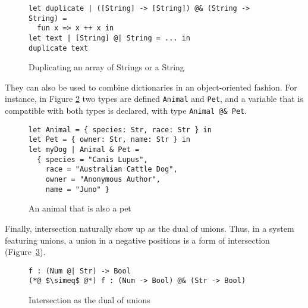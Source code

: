\documentclass[sigplan,10pt,review,anonymous]{acmart}
\newcommand{\nickel}[1]{\lstinline[language=nickel]{#1}}
\begin{document}
\begin{figure}[h]
\begin{lstlisting}[language=nickel]
let duplicate | ([String] -> [String]) @& (String -> String) =
  fun x => x ++ x in
let text | [String] @| String = ... in
duplicate text
\end{lstlisting}
\caption{Duplicating an array of Strings or a String}
\label{fig:intersection-overloading-ex}
\end{figure}



They can also be used to combine dictionaries in an object-oriented fashion. For instance, in Figure \ref{fig:intersection-record}
two types are defined \nickel{Animal} and \nickel{Pet}, and
a variable that is compatible with both types is declared, with
type \nickel{Animal @& Pet}.

\begin{figure}[h]
\begin{lstlisting}[language=nickel]
let Animal = { species: Str, race: Str } in
let Pet = { owner: Str, name: Str } in
let myDog | Animal & Pet =
  { species = "Canis Lupus",
    race = "Australian Cattle Dog",
    owner = "Anonymous Author",
    name = "Juno" }
\end{lstlisting}
\caption{An animal that is also a pet}
\label{fig:intersection-record}
\end{figure}




Finally, intersection naturally show up as the dual of unions.
Thus, in a system
featuring unions, a union in a negative positions is a form of intersection
(Figure~\ref{fig:intersection-dual}).

\begin{figure}[h]
\begin{lstlisting}[language = nickel]
f : (Num @| Str) -> Bool
(*@ $\simeq$ @*) f : (Num -> Bool) @& (Str -> Bool)
\end{lstlisting}
\caption{Intersection as the dual of unions}
\label{fig:intersection-dual}
\end{figure}
\end{document}
